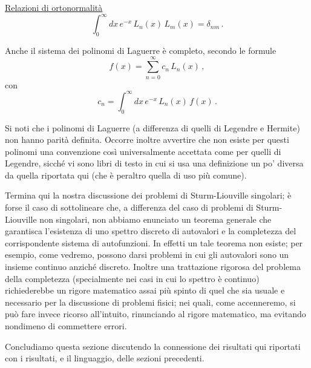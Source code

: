 \documentclass[11pt, a4paper]{book}
\numberwithin{equation}{section}
\begin{document}

\medskip
\noindent\uline{Relazioni di ortonormalità}
\begin{equation}
\int_0^{\infty} dx\, e^{-x}\, L_n(x)\, L_m(x) = \delta_{nm} \,. \tag{52}
\end{equation}

Anche il sistema dei polinomi di Laguerre è completo,
secondo le formule
\begin{equation}
f(x) = \sum_{n=0}^{\infty} c_n\, L_n(x) \,, \tag{53}
\end{equation}
con
\begin{equation}
c_n = \int_0^{\infty} dx\, e^{-x}\, L_n(x)\, f(x) \,. \tag{54}
\end{equation}

Si noti che i polinomi di Laguerre (a differenza di quelli
di Legendre e Hermite) non hanno parità definita. Occorre inoltre
avvertire che non esiste per questi polinomi una convenzione così
universalmente accettata come per quelli di Legendre, sicché vi
sono libri di testo in cui si usa una definizione un po' diversa
da quella riportata qui (che è peraltro quella di uso più comune).

Termina qui la nostra discussione dei problemi di Sturm-Liouville singolari; è forse il caso di sottolineare che, a differenza
del caso di problemi di Sturm-Liouville non singolari, non abbiamo
enunciato un teorema generale che garantisca l'esistenza di uno
spettro discreto di autovalori e la completezza del corrispondente
sistema di autofunzioni. In effetti un tale teorema non esiste; per
esempio, come vedremo, possono darsi problemi in cui gli autovalori sono
un insieme continuo anziché discreto. Inoltre una trattazione rigorosa
del problema della completezza (specialmente nei casi in cui lo spettro
è continuo) richiederebbe un rigore matematico assai più spinto di quel
che sia usuale e necessario per la discussione di problemi fisici; nei
quali, come accenneremo, si può fare invece ricorso all'intuito, rinunciando al rigore matematico, ma evitando nondimeno di commettere
errori.

Concludiamo questa sezione discutendo la connessione dei risultati qui riportati con i risultati, e il linguaggio, delle sezioni precedenti.

\end{document}
